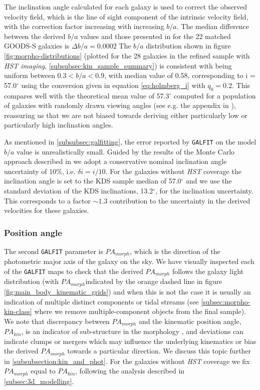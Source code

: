 \documentclass[fleqn,usenatbib]{mn2e}
\begin{document}
The inclination angle calculated for each galaxy is used to correct the observed velocity field, which is the line of sight component of the intrinsic velocity field, with the correction factor increasing with increasing $b/a$.
The median difference between the derived $b/a$ values and those presented in \cite{VanderWel2012} for the 22 matched GOODS-S galaxies is $\Delta b/a = 0.0002$
The $b/a$ distribution shown in figure \ref{fig:morpho-distributions} (plotted for the 28 galaxies in the refined sample with {\em HST imaging}, \cref{subsubsec:kin_sample_summary}) is consistent with being uniform between $0.3 < b/a < 0.9$, with median value of 0.58, corresponding to i = 57.0$^{\circ}$ using the conversion given in equation \ref{eq:holmberg_i} with $q_{0}=0.2$.
This compares well with the theoretical mean value of 57.3$^{\circ}$ computed for a population of galaxies with randomly drawn viewing angles (see e.g. the appendix in \cite{Law2009}), reassuring us that we are not biased towards deriving either particularly low or particularly high inclination angles.

As mentioned in \cref{subsubsec:galfitting}, the error reported by {\tt GALFIT} on the model $b/a$ value is unrealistically small.
Guided by the results of the Monte Carlo approach described in \cite{Epinat2012} we adopt a conservative nominal inclination angle uncertainty of 10$\%$, i.e. $\delta i = i / 10$.
For the galaxies without {\em HST} coverage the inclination angle is set to the KDS sample median of 57.0$^{\circ}$ and we use the standard deviation of the KDS inclinations, 13.2$^{\circ}$, for the inclination uncertainty.
This corresponds to a factor $\sim1.3$ contribution to the uncertainty in the derived velocities for these galaxies.


\subsubsection{Position angle}\label{subsubsection:position_angle}
The second {\tt GALFIT} parameter is $PA_{morph}$, which is the direction of the photometric major axis of the galaxy on the sky.
We have visually inspected each of the {\tt GALFIT} maps to check that the derived $PA_{morph}$ follows the galaxy light distribution (with $PA_{morph}$indicated by the orange dashed line in figure \ref{fig:main_body_kinematic_grids}) and when this is not the case it is usually an indication of multiple distinct components or tidal streams (see \cref{subsec:morpho-kin-class} where we remove multiple-component objects from the final sample).
We note that discrepancy between $PA_{morph}$ and the kinematic position angle, $PA_{kin}$, is an indicator of sub-structure in the morphology \citep[e.g.][]{Queyrel2012,Wisnioski2015,Rodrigues2016}, and deviations can indicate clumps or mergers which may influence the underlying kinematics or bias the derived $PA_{morph}$ towards a particular direction.
We discuss this topic further in \cref{subsubsection:kin_and_phot}.
For the galaxies without {\em HST} coverage we fix $PA_{morph}$ equal to $PA_{kin}$, following the analysis described in \cref{subsec:3d_modelling}.
\end{document}
